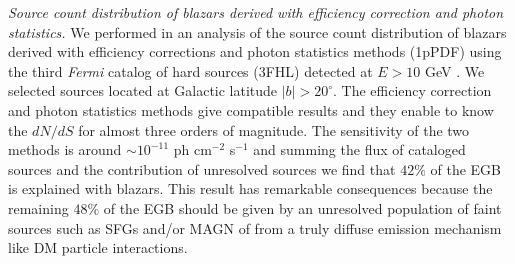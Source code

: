 \documentclass[12 pt]{article}
\begin{document}




{\it Source count distribution of blazars derived with efficiency correction and photon statistics.}
We performed in \cite{DiMauro:2017ing} an analysis of the source count distribution of blazars derived with efficiency corrections and photon statistics methods (1pPDF) using the third {\it Fermi} catalog of hard sources (3FHL) detected at $E>10$ GeV \cite{TheFermi-LAT:2017pvy}. We selected sources located at Galactic latitude $|b|>20^{\circ}$.
The efficiency correction and photon statistics methods give compatible results and they enable to know the $dN/dS$ for almost three orders of magnitude. The sensitivity of the two methods is around $\sim 10^{-11}$ ph cm$^{-2}$ s$^{-1}$ and summing the flux of cataloged sources and the contribution of unresolved sources we find that $42\%$ of the EGB is explained with blazars. 
This result has remarkable consequences because the remaining $48\%$ of the EGB should be given by an unresolved population of faint sources such as SFGs and/or MAGN of from a truly diffuse emission mechanism like DM particle interactions. 
\end{document}
